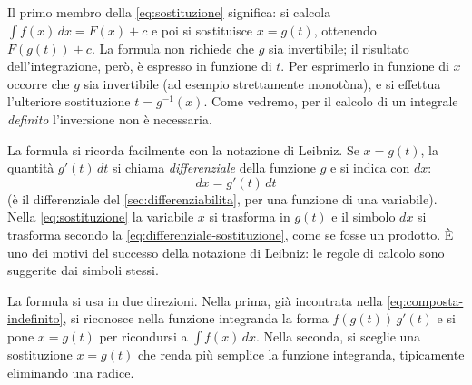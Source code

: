Il primo membro della \eqref{eq:sostituzione} significa: si calcola $\int f(x)\,dx=F(x)+c$
e poi si sostituisce $x=g(t)$, ottenendo $F(g(t))+c$. La formula non richiede che $g$ sia
invertibile; il risultato dell'integrazione, però, è espresso in funzione di $t$. Per
esprimerlo in funzione di $x$ occorre che $g$ sia invertibile (ad esempio strettamente
monotòna), e si effettua l'ulteriore sostituzione $t=g^{-1}(x)$. Come vedremo, per il
calcolo di un integrale \emph{definito} l'inversione non è necessaria.

La formula si ricorda facilmente con la notazione di Leibniz. Se $x=g(t)$, la quantità
$g'(t)\,dt$ si chiama \emph{differenziale} della funzione $g$ e si indica con $dx$:
\begin{equation}\label{eq:differenziale-sostituzione}
  dx=g'(t)\,dt
\end{equation}
(è il differenziale del \cref{sec:differenziabilita}, per una funzione di una variabile).
Nella \eqref{eq:sostituzione} la variabile $x$ si trasforma in $g(t)$ e il simbolo $dx$ si
trasforma secondo la \eqref{eq:differenziale-sostituzione}, come se fosse un prodotto. È
uno dei motivi del successo della notazione di Leibniz: le regole di calcolo sono
suggerite dai simboli stessi.

La formula si usa in due direzioni. Nella prima, già incontrata nella
\eqref{eq:composta-indefinito}, si riconosce nella funzione integranda la forma
$f(g(t))\,g'(t)$ e si pone $x=g(t)$ per ricondursi a $\int f(x)\,dx$. Nella seconda, si
sceglie una sostituzione $x=g(t)$ che renda più semplice la funzione integranda,
tipicamente eliminando una radice.

